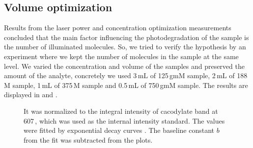 \subsection{Volume optimization}

Results from the laser power and concentration optimization measurements
concluded that the main factor influencing the photodegradation of the sample
is the number of illuminated molecules.
So, we tried to verify the hypothesis by an experiment where we kept the
number of molecules in the sample at the same level.
We varied the concentration and volume of the samples and preserved the amount
of the analyte, concretely we used
	3\,mL of 125\,g{m}M sample,
	2\,mL of 188\,M sample,
	1\,mL of 375\,M sample and
	0.5\,mL of 750\,g{m}M sample.
The results are displayed in
and
.

\begin{figure}
	\centering
	
	\caption[%
		Decrease of the integral intensity of the polyU band at 1231\,\icm{}
		for different volumes with a preserved number of molecules in raw spectra
		using backscattering geometry.%
	]{%
		It was normalized to the integral intensity of cacodylate band at
		607\,\icm{}, which was used as the internal intensity standard.
		The values were fitted	by exponential decay curves
		.
		The baseline constant $b$ from the fit was subtracted from the plots.
	}
	\label{\figlabel{vol_optim:hairpins}}
\end{figure}

\begin{table}
	\centering
	
	\caption[%
		Lifetimes of the polyU in dependence on concentration
		for different volumes with a preserved number of molecules in raw spectra
		using backscattering geometry.%
	]{%
		$E_0$ are total energies accumulated by the detector divided by the
		maximal value across all the concentrations $c$ and normalized to the
		concentration.
	}
	\label{\tablabel{vol_optim:lifetimes_hairpins}}
\end{table}

